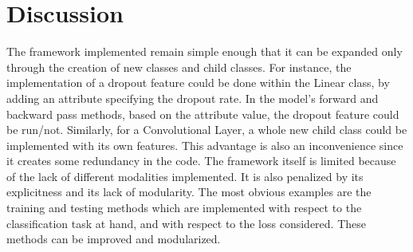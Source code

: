 \documentclass[10pt, a4paper]{article}
\begin{document}
\section{Discussion}The framework implemented remain simple enough that it can be expanded only through the creation of new classes and child classes. For instance, the implementation of a dropout feature could be done within the Linear class, by adding an attribute specifying the dropout rate. In the model's forward and backward pass methods, based on the attribute value, the dropout feature could be run/not. Similarly, for a Convolutional Layer, a whole new child class could be implemented with its own features. 
This advantage is also an inconvenience since it creates some redundancy in the code. 
The framework itself is limited because of the lack of different modalities implemented. It is also penalized by its explicitness and its lack of modularity.
The most obvious examples are the training and testing methods which are implemented with respect to the classification task at hand, and with respect to the loss considered. These methods can be improved and modularized. 
\end{document}
